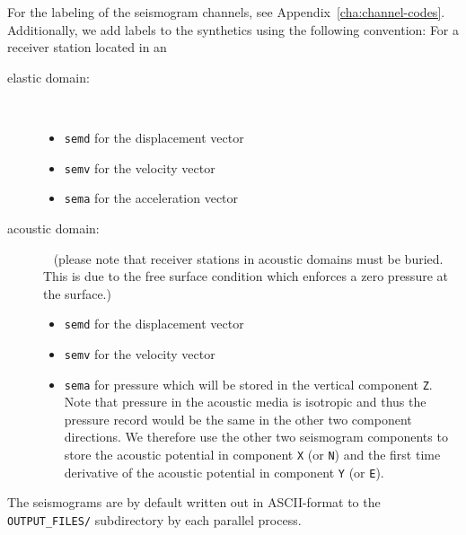 For the labeling of the seismogram channels, see Appendix~\ref{cha:channel-codes}.
Additionally, we add labels to the synthetics using the following
convention: For a receiver station located in an
\begin{description}
\item [{elastic domain:}] ~
\begin{itemize}
\item \texttt{semd} for the displacement vector
\item \texttt{semv} for the velocity vector
\item \texttt{sema} for the acceleration vector
\end{itemize}
\item [{acoustic domain:}] ~\newline
 (please note that receiver stations in acoustic domains must be buried.
This is due to the free surface condition which enforces a zero pressure
at the surface.)
\begin{itemize}
\item \texttt{semd} for the displacement vector
\item \texttt{semv} for the velocity vector
\item \texttt{sema} for pressure which will be stored in the vertical component
\texttt{Z}. Note that pressure in the acoustic media is isotropic
and thus the pressure record would be the same in the other two component
directions. We therefore use the other two seismogram components to
store the acoustic potential in component \texttt{X} (or \texttt{N})
and the first time derivative of the acoustic potential in component
\texttt{Y} (or \texttt{E}).
\end{itemize}
\end{description}
The seismograms are by default written out in ASCII-format to the
\texttt{OUTPUT\_FILES/} subdirectory by each parallel process.

